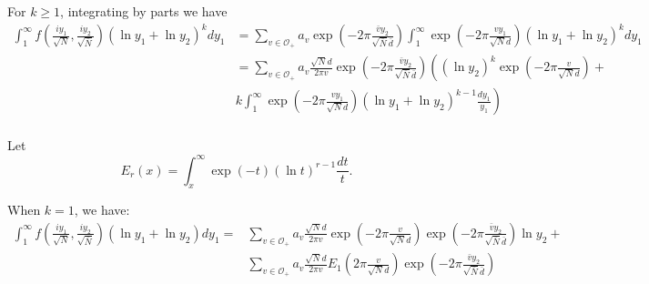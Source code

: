 \documentclass{article}
\theoremstyle{plain}
\begin{document}
For $k \geq 1$, integrating by parts we have
\begin{align*}
 \int_{1}^{\infty} f\left(\frac{iy_1}{\sqrt{N}},\frac{iy_2}{\sqrt{\bar{N}}}\right) (\ln y_1+\ln y_2)^k dy_1
 &= \sum_{v \in \mathcal{O}_+} a_v  \exp \left( -2\pi \frac{\bar{v} y_2}{\sqrt{\bar{N}}\bar{d}}\right)\int_{1}^{\infty} \exp\left( -2\pi \frac{vy_1}{\sqrt{N} d}\right) (\ln y_1+\ln y_2)^k dy_1\\
 &= \sum_{v \in \mathcal{O}_+} a_v \frac{\sqrt{N}d}{2 \pi v} \exp \left( -2\pi \frac{\bar{v} y_2}{\sqrt{\bar{N}}\bar{d}}\right) \left((\ln y_2)^k \exp\left( -2\pi \frac{v}{\sqrt{N} d}\right) \right. + \\
 & \left. k \int_1^{\infty} \exp\left( -2\pi \frac{vy_1}{\sqrt{N} d}\right) (\ln y_1+\ln y_2)^{k-1} \frac{dy_1}{y_1}\right)\\
\end{align*}


Let
\begin{equation*}
E_r(x)=\int_x^{\infty} \exp(-t) (\ln t)^{r-1}\frac{dt}{t}.
\end{equation*}

When $k=1$, we have:
\begin{align*}
\int_{1}^{\infty} f\left(\frac{iy_1}{\sqrt{N}},\frac{iy_2}{\sqrt{\bar{N}}}\right) (\ln y_1+\ln y_2) dy_1
= & \sum_{v \in \mathcal{O}_+} a_v \frac{\sqrt{N}d}{2 \pi v} \exp\left( -2\pi \frac{v}{\sqrt{N} d}\right)  \exp \left( -2\pi \frac{\bar{v} y_2}{\sqrt{\bar{N}}\bar{d}}\right) \ln y_2 + \\
& \sum_{v \in \mathcal{O}_+} a_v \frac{\sqrt{N}d}{2 \pi v} E_1\left( 2\pi \frac{v}{\sqrt{N} d}\right) \exp \left( -2\pi \frac{\bar{v} y_2}{\sqrt{\bar{N}}\bar{d}}\right)
\end{align*}
\end{document}
